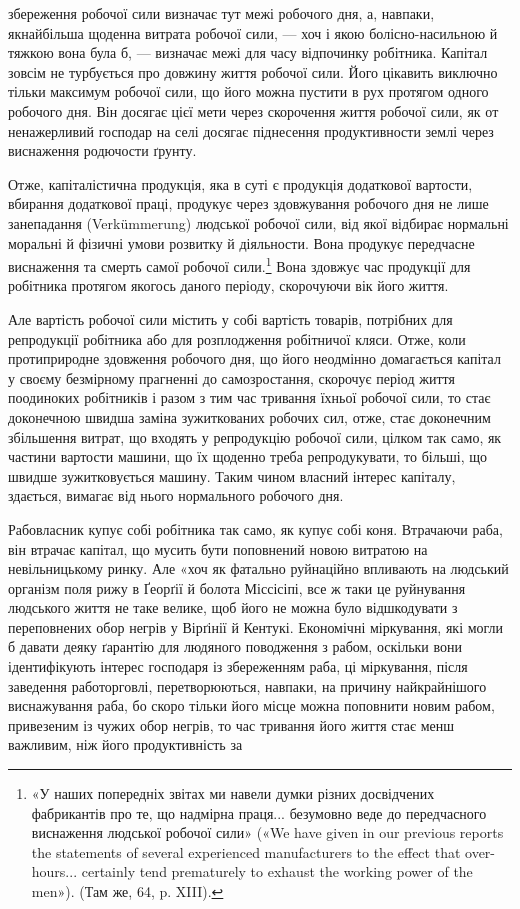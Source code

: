 \parcont{}  %
збереження робочої сили визначає тут межі робочого дня, а,
навпаки, якнайбільша щоденна витрата робочої сили, — хоч і
якою болісно-насильною й тяжкою вона була б, — визначає
межі для часу відпочинку робітника. Капітал зовсім не турбується
про довжину життя робочої сили. Його цікавить виключно тільки
максимум робочої сили, що його можна пустити в рух протягом
одного робочого дня. Він досягає цієї мети через скорочення життя
робочої сили, як от ненажерливий господар на селі досягає піднесення
продуктивности землі через виснаження родючости ґрунту.

Отже, капіталістична продукція, яка в суті є продукція додаткової
вартости, вбирання додаткової праці, продукує через
здовжування робочого дня не лише занепадання (Verkümmerung)
людської робочої сили, від якої відбирає нормальні моральні й
фізичні умови розвитку й діяльности. Вона продукує передчасне
виснаження та смерть самої робочої сили.\footnote{
«У наших попередніх звітах ми навели думки різних досвідчених
фабрикантів про те, що надмірна праця... безумовно веде до передчасного
виснаження людської робочої сили» («We have given in our previous
reports the statements of several experienced manufacturers to the effect
that over-hours... certainly tend prematurely to exhaust the working
power of the men»). (Там же, 64, p. XIII).
} Вона здовжує
час продукції для робітника протягом якогось даного періоду,
скорочуючи вік його життя.

Але вартість робочої сили містить у собі вартість товарів,
потрібних для репродукції робітника або для розплодження
робітничої кляси. Отже, коли протиприродне здовження робочого
дня, що його неодмінно домагається капітал у своєму безмірному
прагненні до самозростання, скорочує період життя поодиноких
робітників і разом з тим час тривання їхньої робочої сили, то
стає доконечною швидша заміна зужиткованих робочих сил, отже,
стає доконечним збільшення витрат, що входять у репродукцію
робочої сили, цілком так само, як частини вартости машини, що
їх щоденно треба репродукувати, то більші, що швидше зужитковується
машину. Таким чином власний інтерес капіталу, здається,
вимагає від нього нормального робочого дня.

Рабовласник купує собі робітника так само, як купує собі
коня. Втрачаючи раба, він втрачає капітал, що мусить бути поповнений
новою витратою на невільницькому ринку. Але «хоч
як фатально руйнаційно впливають на людський організм поля
рижу в Ґеорґії й болота Міссісіпі, все ж таки це руйнування людського
життя не таке велике, щоб його не можна було відшкодувати
з переповнених обор негрів у Вірґінії й Кентукі. Економічні
міркування, які могли б давати деяку ґарантію для людяного
поводження з рабом, оскільки вони ідентифікують інтерес господаря
із збереженням раба, ці міркування, після заведення работорговлі,
перетворюються, навпаки, на причину найкрайнішого
виснажування раба, бо скоро тільки його місце можна поповнити
новим рабом, привезеним із чужих обор негрів, то час тривання
його життя стає менш важливим, ніж його продуктивність за
\parbreak{}  %
